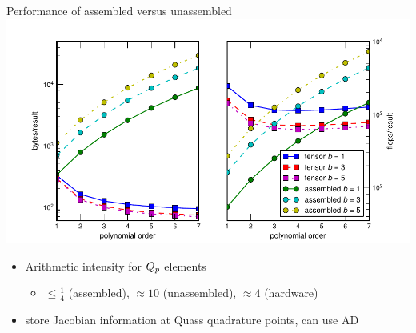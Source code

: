 \begin{frame}[shrink=5]{Performance of assembled versus unassembled}
  \includegraphics[width=\textwidth]{figures/TensorVsAssembly} \\
  \begin{itemize}
  \item Arithmetic intensity for $Q_{p}$ elements
    \begin{itemize}
    \item $\le \frac 1 4$ (assembled), $\approx 10$ (unassembled), $\approx 4$ (hardware)
    \end{itemize}
  \item store Jacobian information at Quass quadrature points, can use AD
  \end{itemize}
\end{frame}
